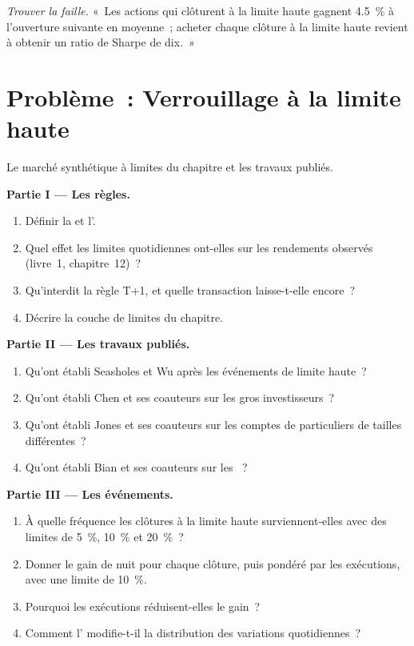 \begin{exercise}[$\star\star\star$]\label{exo:s1:asia-specific-equity-strategies:8}
\emph{Trouver la faille.} «~Les actions qui clôturent à la limite haute gagnent 4.5~\% à l'ouverture suivante en moyenne~; acheter chaque clôture à la limite haute revient à obtenir un ratio de Sharpe de dix.~»
\end{exercise}

\section{Problème~: Verrouillage à la limite haute}

\begin{problem}\label{pb:s1:asia-specific-equity-strategies:1}
Le marché synthétique à limites du chapitre et les travaux publiés.

\medskip\noindent\textbf{Partie I --- Les règles.}
\begin{enumerate}
\item Définir la  et l'.
\item Quel effet les limites quotidiennes ont-elles sur les rendements observés (livre~1, chapitre~12)~?
\item Qu'interdit la règle T+1, et quelle transaction laisse-t-elle encore~?
\item Décrire la couche de limites du chapitre.
\end{enumerate}

\medskip\noindent\textbf{Partie II --- Les travaux publiés.}
\begin{enumerate}[resume]
\item Qu'ont établi Seasholes et Wu après les événements de limite haute~?
\item Qu'ont établi Chen et ses coauteurs sur les gros investisseurs~?
\item Qu'ont établi Jones et ses coauteurs sur les comptes de particuliers de tailles différentes~?
\item Qu'ont établi Bian et ses coauteurs sur les ~?
\end{enumerate}

\medskip\noindent\textbf{Partie III --- Les événements.}
\begin{enumerate}[resume]
\item À quelle fréquence les clôtures à la limite haute surviennent-elles avec des limites de 5~\%, 10~\% et 20~\%~?
\item Donner le gain de nuit pour chaque clôture, puis pondéré par les exécutions, avec une limite de 10~\%.
\item Pourquoi les exécutions réduisent-elles le gain~?
\item Comment l' modifie-t-il la distribution des variations quotidiennes~?
\end{enumerate}


\end{problem}

